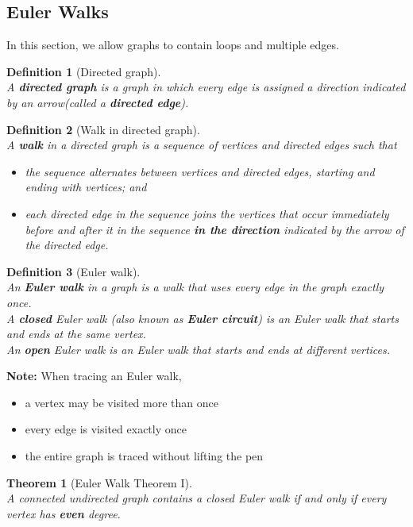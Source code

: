 \documentclass[12pt]{article}
\newtheorem{definition}{Definition}[section]
\newtheorem{theorem}{Theorem}[section]
\theoremstyle{definition}
\begin{document}
\subsection{Euler Walks}
In this section, we allow graphs to contain loops and multiple edges.
\begin{definition}[Directed graph] 
\hfill\\\normalfont A \textbf{directed graph} is a graph in which \textit{every} edge is assigned a direction indicated by an arrow(called a \textbf{directed edge}).
\end{definition}
\begin{definition}[Walk in directed graph]
\hfill\\\normalfont A \textbf{walk} in a directed graph is a sequence of vertices and directed edges such that
\begin{itemize}
  \item the sequence alternates between vertices and directed edges, starting and ending with vertices; and
  \item each directed edge in the sequence joins the vertices that occur immediately before and after it in the sequence \textbf{in the direction} indicated by the arrow of the directed edge.
\end{itemize}
\end{definition}
\begin{definition}[Euler walk]
\hfill\\\normalfont An \textbf{Euler walk} in a graph is a walk that uses every edge in the graph exactly once.\\
A \textbf{closed} Euler walk (also known as \textbf{Euler circuit}) is an Euler walk that starts and ends at the same vertex.\\
An \textbf{open} Euler walk is an Euler walk that starts and ends at different vertices.
\end{definition}
\textbf{Note:} When tracing an Euler walk,
\begin{itemize}
  \item a vertex may be visited more than once
  \item every edge is visited exactly once
  \item the entire graph is traced without lifting the pen
\end{itemize}
\begin{theorem}[Euler Walk Theorem I]
\hfill\\\normalfont A connected \textit{undirected} graph contains a \textit{closed} Euler walk if and only if \textit{every} vertex has \textbf{even} degree. 
\end{theorem} 
\end{document}
